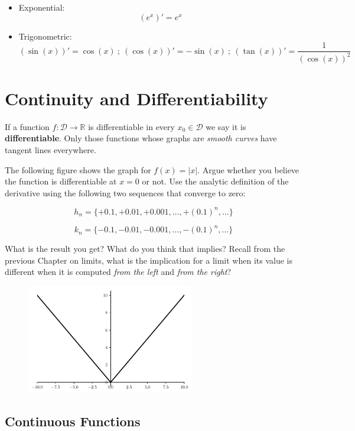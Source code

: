 \documentclass[a4paper,11pt]{article}
\theoremstyle{definition}
\theoremstyle{plain}
\begin{document}
\begin{itemize}
\item
  Exponential: \[\left(e^x\right)' = e^x\]
\item
  Trigonometric: \[
  \left(\sin(x)\right)' = \cos(x) \ ; \ \left(\cos(x)\right)' = -\sin(x) \ ; \ \left(\tan(x)\right)' = \frac{1}{\left(\cos(x)\right)^2}
  \]
\end{itemize}

\section{Continuity and
Differentiability}\label{continuity-and-differentiability}

If a function \(f : \mathcal{D}\rightarrow\mathbb{R}\) is differentiable
in every \(x_0\in\mathcal{D}\) we say it is \textbf{differentiable}.
Only those functions whose graphs are \emph{smooth curves} have tangent
lines everywhere.

The following figure shows the graph for \(f(x) = \lvert x \rvert\).
Argue whether you believe the function is differentiable at \(x = 0\) or
not. Use the analytic definition of the derivative using the following
two sequences that converge to zero:

\[
h_n = \{+0.1, +0.01,+0.001,\ldots,+(0.1)^n,\ldots\}
\]

\[
k_n = \{-0.1, -0.01,-0.001,\ldots,-(0.1)^n,\ldots\}
\]

What is the result you get? What do you think that implies? Recall from
the previous Chapter on limits, what is the implication for a limit when
its value is different when it is computed \emph{from the left} and
\emph{from the right}?

    \begin{figure}[htbp]
    	\centering 
    		\includegraphics[width = 0.65\textwidth]{Ch2_files/Ch2_9_0.pdf}
    \end{figure}
    
    \subsection{Continuous Functions}\label{continuous-functions}
\end{document}
